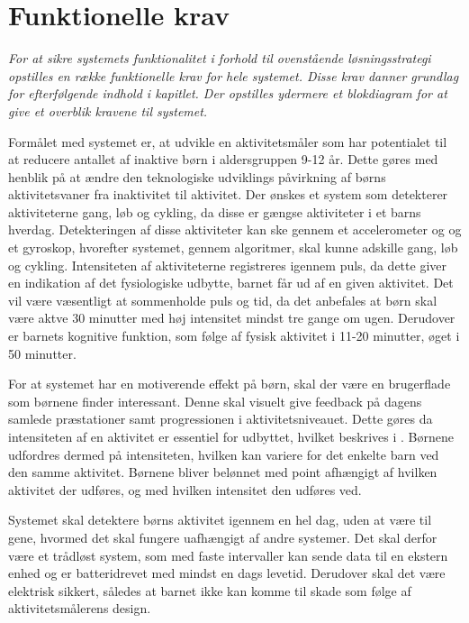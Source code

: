 \section{Funktionelle krav}\label{funktionellekrav}
\textit{For at sikre systemets funktionalitet i forhold til ovenstående løsningsstrategi opstilles en række funktionelle krav for hele systemet. Disse krav danner grundlag for efterfølgende indhold i kapitlet. Der opstilles ydermere et blokdiagram for at give et overblik kravene til systemet.}

Formålet med systemet er, at udvikle en aktivitetsmåler som har potentialet til at reducere antallet af inaktive børn i aldersgruppen 9-12 år. Dette gøres med henblik på at ændre den teknologiske udviklings påvirkning af børns aktivitetsvaner fra inaktivitet til aktivitet.
Der ønskes et system som detekterer aktiviteterne gang, løb og cykling, da disse er gængse aktiviteter i et barns hverdag. Detekteringen af disse aktiviteter kan ske gennem et accelerometer og og et gyroskop, hvorefter systemet, gennem algoritmer, skal kunne adskille gang, løb og cykling.
Intensiteten af aktiviteterne registreres igennem puls, da dette giver en indikation af det fysiologiske udbytte, barnet får ud af en given aktivitet. Det vil være væsentligt at sommenholde puls og tid, da det anbefales at børn skal være aktve 30 minutter med høj intensitet mindst tre gange om ugen. Derudover er barnets kognitive funktion, som følge af fysisk aktivitet i 11-20 minutter, øget i 50 minutter.

For at systemet har en motiverende effekt på børn, skal der være en brugerflade som børnene finder interessant. Denne skal visuelt give feedback på dagens samlede præstationer samt progressionen i aktivitetsniveauet. Dette gøres da intensiteten af en aktivitet er essentiel for udbyttet, hvilket beskrives i . Børnene udfordres dermed på intensiteten, hvilken kan variere for det enkelte barn ved den samme aktivitet. Børnene bliver belønnet med point afhængigt af hvilken aktivitet der udføres, og med hvilken intensitet den udføres ved.  

Systemet skal detektere børns aktivitet igennem en hel dag, uden at være til gene, hvormed det skal fungere uafhængigt af andre systemer. Det skal derfor være et trådløst system, som med faste intervaller kan sende data til en ekstern enhed og er batteridrevet med mindst en dags levetid. Derudover skal det være elektrisk sikkert, således at barnet ikke kan komme til skade som følge af aktivitetsmålerens design. 

